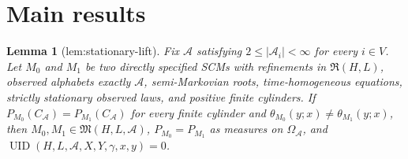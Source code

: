 \documentclass{article}
\newtheorem{lemma}{Lemma}
\begin{document}
\section{Main results}

\begin{lemma}[lem:stationary-lift]\label{lem:stationary-lift}
Fix \(\mathcal A\) satisfying \(2\le|\mathcal A_i|<\infty\) for every \(i\in V\).  Let \(M_0\) and \(M_1\) be two directly specified SCMs with refinements in \(\mathfrak R(H,L)\), observed alphabets exactly \(\mathcal A\), semi-Markovian roots, time-homogeneous equations, strictly stationary observed laws, and positive finite cylinders.  If \(P_{M_0}(C_{\mathcal A})=P_{M_1}(C_{\mathcal A})\) for every finite cylinder and \(\theta_{M_0}(y;x)\ne\theta_{M_1}(y;x)\), then \(M_0,M_1\in\mathfrak M(H,L,\mathcal A)\), \(P_{M_0}=P_{M_1}\) as measures on \(\Omega_{\mathcal A}\), and \(\operatorname{UID}(H,L,\mathcal A,X,Y,\gamma,x,y)=0\).
\end{lemma}
\end{document}
